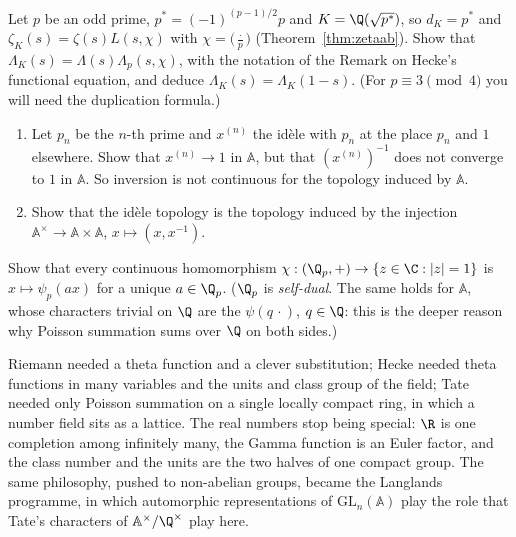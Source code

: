 \begin{exercise}[$\star\star$]\label{ex:hecke}
Let $p$ be an odd prime, $p^*=(-1)^{(p-1)/2}p$ and $K=\Q(\sqrt{p^*})$, so $d_K=p^*$ and $\zeta_K(s)=\zeta(s)L(s,\chi)$ with $\chi=\bigl(\frac\cdot p\bigr)$
(Theorem~\ref{thm:zetaab}). Show that $\Lambda_K(s)=\Lambda(s)\Lambda_p(s,\chi)$, with the notation of the Remark on Hecke's functional equation, and deduce
$\Lambda_K(s)=\Lambda_K(1-s)$. (For $p\equiv3\pmod 4$ you will need the duplication formula.)
\end{exercise}

\begin{exercise}[$\star\star$]\label{ex:ideletop}
\begin{enumerate}[label=(\alph*)]
\item Let $p_n$ be the $n$-th prime and $x^{(n)}$ the id\`ele with $p_n$ at the place $p_n$ and $1$ elsewhere. Show that $x^{(n)}\to1$ in $\mathbb{A}$, but that
$(x^{(n)})^{-1}$ does not converge to $1$ in $\mathbb{A}$. So inversion is not continuous for the topology induced by $\mathbb{A}$.
\item Show that the id\`ele topology is the topology induced by the injection $\mathbb{A}^\times\to\mathbb{A}\times\mathbb{A}$, $x\mapsto(x,x^{-1})$.
\end{enumerate}
\end{exercise}

\begin{exercise}[$\star\star\star$]\label{ex:selfdual}
Show that every continuous homomorphism $\chi:(\Q_p,+)\to\{z\in\C:|z|=1\}$ is $x\mapsto\psi_p(ax)$ for a unique $a\in\Q_p$. ($\Q_p$ is \emph{self-dual}. The
same holds for $\mathbb{A}$, whose characters trivial on $\Q$ are the $\psi(q\,\cdot)$, $q\in\Q$: this is the deeper reason why Poisson summation sums over $\Q$
on both sides.)
\end{exercise}

\begin{beauty}
Riemann needed a theta function and a clever substitution; Hecke needed theta functions in many variables and the units and class group of the field;
Tate needed only Poisson summation on a single locally compact ring, in which a number field sits as a lattice. The real numbers stop being special:
$\R$ is one completion among infinitely many, the Gamma function is an Euler factor, and the class number and the units are the two halves of one compact
group. The same philosophy, pushed to non-abelian groups, became the Langlands programme, in which automorphic representations of $\mathrm{GL}_n(\mathbb{A})$
play the role that Tate's characters of $\mathbb{A}^\times/\Q^\times$ play here.
\end{beauty}

